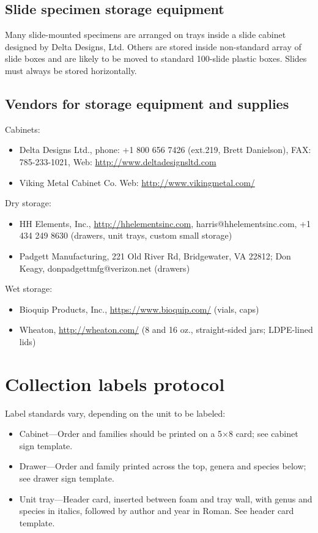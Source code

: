 \documentclass[letterpaper, 11pt]{article}
\begin{document}
\subsection{Slide specimen storage equipment}
Many slide-mounted specimens are arranged on trays inside a slide cabinet designed by Delta Designs, Ltd. Others are stored inside non-standard array of slide boxes and are likely to be moved to standard 100-slide plastic boxes. Slides must always be stored horizontally.

\subsection{Vendors for storage equipment and supplies}
Cabinets:
\begin{itemize}
\item Delta Designs Ltd., phone: +1 800 656 7426 (ext.219, Brett Danielson), FAX: 785-233-1021, Web: \url{http://www.deltadesignsltd.com}
\item Viking Metal Cabinet Co. Web: \url{http://www.vikingmetal.com/}
\end{itemize}

\noindent{}Dry storage:
\begin{itemize}
\item HH Elements, Inc., \url{http://hhelementsinc.com}, harris@hhelementsinc.com, +1 434 249 8630 (drawers, unit trays, custom small storage)
\item Padgett Manufacturing, 221 Old River Rd, Bridgewater, VA 22812; Don Keagy, donpadgettmfg@verizon.net (drawers)
\end{itemize}

\noindent{}Wet storage:
\begin{itemize}
\item Bioquip Products, Inc., \url{https://www.bioquip.com/} (vials, caps)
\item Wheaton, \url{http://wheaton.com/} (8 and 16 oz., straight-sided jars; LDPE-lined lids)
\end{itemize}

\section{Collection labels protocol}%
Label standards vary, depending on the unit to be labeled:
\begin{itemize}
\item Cabinet---Order and families should be printed on a 5$\times$8 card; see cabinet sign template.
\item Drawer---Order and family printed across the top, genera and species below; see drawer sign template.
\item Unit tray---Header card, inserted between foam and tray wall, with genus and species in italics, followed by author and year in Roman. See header card template.
\end{itemize}


%
%
\end{document}
